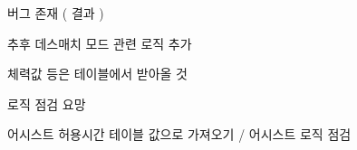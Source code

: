 
\begin{DoxyRefList}
\item[\label{todo__todo000005}%
\Hypertarget{todo__todo000005}%
멤버 \hyperlink{_server_8cpp_abf341ef4337bac826faa9530cac0e106}{D\+E\+F\+R\+M\+I\+\_\+\+Space\+War\+\_\+\+Request\+Game\+End} (\hyperlink{class_server}{Server})]버그 존재 ( 결과 )  
\item[\label{todo__todo000004}%
\Hypertarget{todo__todo000004}%
멤버 \hyperlink{_server_8cpp_a9aba92f1517efaea934ae74bacd8f7de}{D\+E\+F\+R\+M\+I\+\_\+\+Space\+War\+\_\+\+Request\+Network\+Game\+Mode\+Change} (\hyperlink{class_server}{Server})]추후 데스매치 모드 관련 로직 추가  
\item[\label{todo__todo000001}%
\Hypertarget{todo__todo000001}%
멤버 \hyperlink{class_room_client_a0ba33e4df82c58b4d7f8278daefc6bd9}{Room\+Client\+:\+:Game\+Reset} ()]체력값 등은 테이블에서 받아올 것  
\item[\label{todo__todo000003}%
\Hypertarget{todo__todo000003}%
멤버 \hyperlink{class_room_client_a77d6732bdd92fd7222949f8408a1a4d4}{Room\+Client\+:\+:Get\+Assist\+Client\+List} ()]로직 점검 요망  
\item[\label{todo__todo000002}%
\Hypertarget{todo__todo000002}%
멤버 \hyperlink{class_room_client_aa1914f4585c26f5073c3f8639d38aa41}{Room\+Client\+:\+:Player\+Dead} (float dead\+Time)]어시스트 허용시간 테이블 값으로 가져오기 / 어시스트 로직 점검 
\end{DoxyRefList}